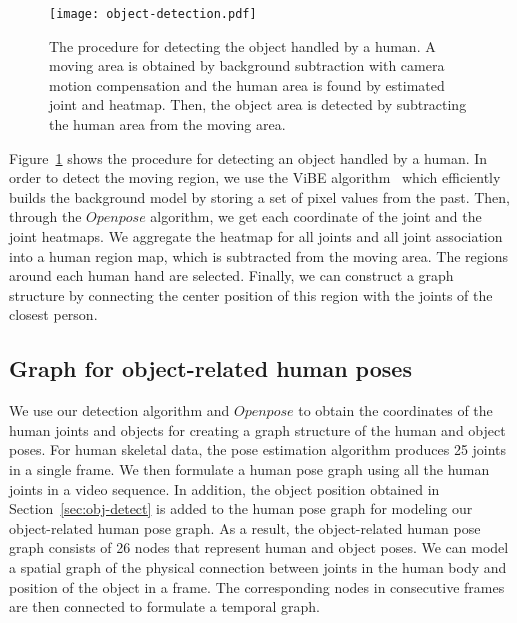 \documentclass[10pt,twocolumn,letterpaper]{article}
\begin{document}
\begin{figure}[t]
\begin{center}
   \texttt{[image: object-detection.pdf]}
\end{center}
   \caption{The procedure for detecting the object handled by a human. A moving area is obtained by background subtraction with camera motion compensation and the human area is found by estimated joint and heatmap. Then, the object area is detected by subtracting the human area from the moving area.
   }
\label{fig:object-det}
\end{figure}

Figure~\ref{fig:object-det} shows the procedure for detecting an object handled by a human.
In order to detect the moving region, we use the ViBE algorithm~\cite{Barnich:2011ks} which efficiently builds the background model by storing a set of pixel values from the past.
Then, through the $Openpose$ algorithm, we get each coordinate of the joint and the joint heatmaps.
We aggregate the heatmap for all joints and all joint association into a human region map, which is subtracted from the moving area.
The regions around each human hand are selected.
Finally, we can construct a graph structure by connecting the center position of this region with the joints of the closest person.

\subsection{Graph for object-related human poses}
\label{sec:graph-construct}
We use our detection algorithm and $Openpose$ to obtain the coordinates of the human joints and objects for creating a graph structure of the human and object poses.
For human skeletal data, the pose estimation algorithm produces 25 joints in a single frame.
We then formulate a human pose graph using all the human joints in a video sequence.
In addition, the object position obtained in Section~\ref{sec:obj-detect} is added to the human pose graph for modeling our object-related human pose graph.
As a result, the object-related human pose graph consists of 26 nodes that represent human and object poses.
We can model a spatial graph of the physical connection between joints in the human body and position of the object in a frame.
The corresponding nodes in consecutive frames are then connected to formulate a temporal graph.
\end{document}
